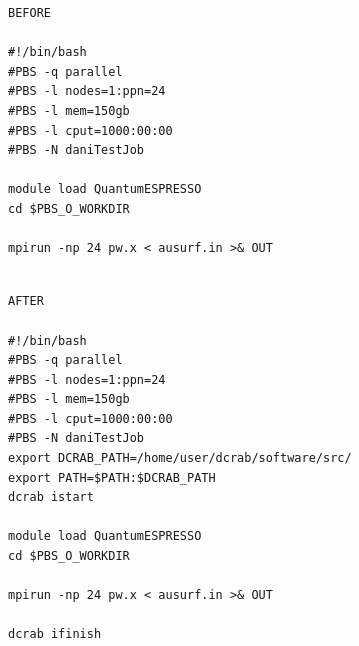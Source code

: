 \documentclass[10pt,a4paper]{report}
\begin{document}
\pagebreak

\begin{multicols}{2}
\begin{verbatim}
BEFORE

#!/bin/bash
#PBS -q parallel
#PBS -l nodes=1:ppn=24
#PBS -l mem=150gb
#PBS -l cput=1000:00:00
#PBS -N daniTestJob

module load QuantumESPRESSO
cd $PBS_O_WORKDIR

mpirun -np 24 pw.x < ausurf.in >& OUT

\end{verbatim}

\columnbreak

\begin{verbatim}

AFTER

#!/bin/bash
#PBS -q parallel
#PBS -l nodes=1:ppn=24
#PBS -l mem=150gb
#PBS -l cput=1000:00:00
#PBS -N daniTestJob
export DCRAB_PATH=/home/user/dcrab/software/src/
export PATH=$PATH:$DCRAB_PATH
dcrab istart

module load QuantumESPRESSO
cd $PBS_O_WORKDIR

mpirun -np 24 pw.x < ausurf.in >& OUT

dcrab ifinish
\end{verbatim}
\end{multicols}
\end{document}
